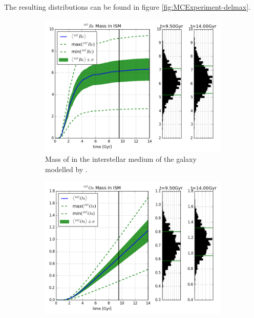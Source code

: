 The resulting distributions can be found in figure \ref{fig:MCExperiment-delmax}.
\begin{figure}
  \centering
  \begin{subfigure}{\subfigwidth}
    \includegraphics[width=\linewidth]{results/MCExperiment_revised_2_delmax/combined_plot_Re-187_decayed.png}
    \caption{ \label{fig:MCExperiment-delmax-re187}
      Mass of  in the interstellar medium of the galaxy modelled by \omegamodel.
    }
  \end{subfigure}
  \begin{subfigure}{\subfigwidth}
    \includegraphics[width=\linewidth]{results/MCExperiment_revised_2_delmax/combined_plot_Os-187_decayed.png}

\end{subfigure}
\end{figure}
